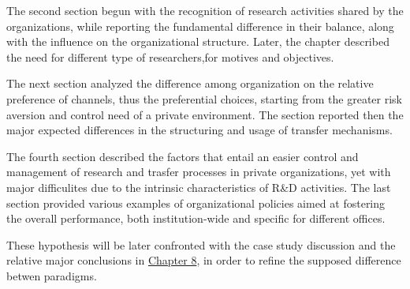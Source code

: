 The second section begun with the recognition of research activities shared by the organizations, while reporting the fundamental difference in their balance, along with the influence on the organizational structure. Later, the chapter described the need for different type of researchers,for motives and objectives.

The next section analyzed the difference among organization on the relative preference of channels, thus the preferential choices, starting from the greater risk aversion and control need of a private environment. The section reported then the major expected differences in the structuring and usage of transfer mechanisms.

The fourth section described the factors that entail an easier control and management of research and trasfer processes in private organizations, yet with major difficulites due to the intrinsic characteristics of R\&D activities. The last section provided various examples of organizational policies aimed at fostering the overall performance, both institution-wide and specific for different offices. 

These hypothesis will be later confronted with the case study discussion and the relative major conclusions in \hyperref[Chapter8]{Chapter 8}, in order to refine the supposed difference betwen paradigms. 
